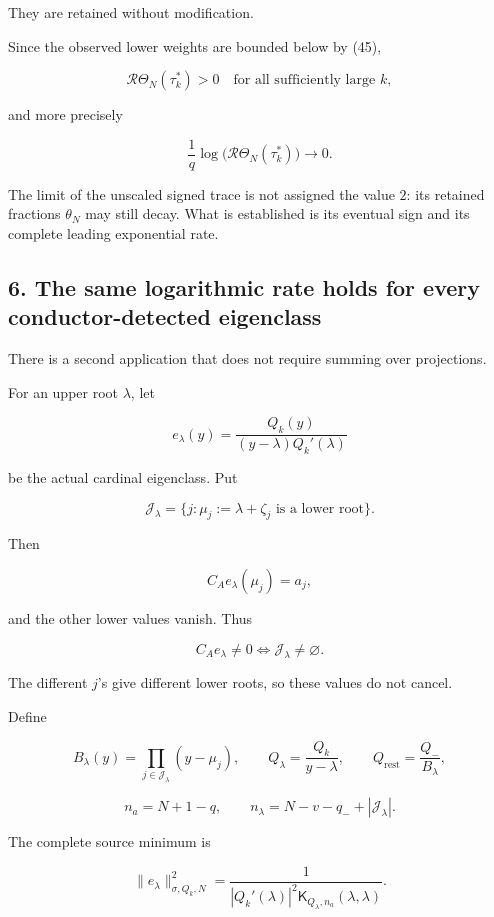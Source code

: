 \documentclass[11pt]{article}
\begin{document}
They are retained without modification.

Since the observed lower weights are bounded below by (45),

\[
\boxed{
\mathcal R\Theta_N(\tau_k^*)>0
\quad\text{for all sufficiently large }k,
}
\tag{51}
\]

and more precisely

\[
\boxed{
\frac1q\log\bigl(\mathcal R\Theta_N(\tau_k^*)\bigr)
\longrightarrow0.
}
\tag{52}
\]

The limit of the unscaled signed trace is not assigned the value \(2\): its retained fractions \(\theta_N\) may still decay. What is established is its eventual sign and its complete leading exponential rate.

\subsection{6. The same logarithmic rate holds for every conductor-detected eigenclass}\label{the-same-logarithmic-rate-holds-for-every-conductor-detected-eigenclass}

There is a second application that does not require summing over projections.

For an upper root \(\lambda\), let

\[
e_\lambda(y)=
\frac{Q_k(y)}{(y-\lambda)Q_k'(\lambda)}
\]

be the actual cardinal eigenclass. Put

\[
\mathcal J_\lambda=
\{j:\mu_j:=\lambda+\zeta_j
\text{ is a lower root}\}.
\]

Then

\[
C_Ae_\lambda(\mu_j)=a_j,
\]

and the other lower values vanish. Thus

\[
C_Ae_\lambda\ne0
\iff\mathcal J_\lambda\ne\varnothing.
\tag{53}
\]

The different \(j\)'s give different lower roots, so these values do not cancel.

Define

\[
B_\lambda(y)=\prod_{j\in\mathcal J_\lambda}(y-\mu_j),
\qquad
Q_\lambda=\frac{Q_k}{y-\lambda},
\qquad
Q_{\mathrm{rest}}=\frac{Q_-}{B_\lambda},
\]

\[
n_a=N+1-q,\qquad
n_\lambda=N-v-q_-+|\mathcal J_\lambda|.
\]

The complete source minimum is

\[
\|e_\lambda\|_{\sigma,Q_k,N}^2
=
\frac1{|Q_k'(\lambda)|^2
\mathsf K_{Q_\lambda,n_a}(\lambda,\lambda)}.
\]
\end{document}
